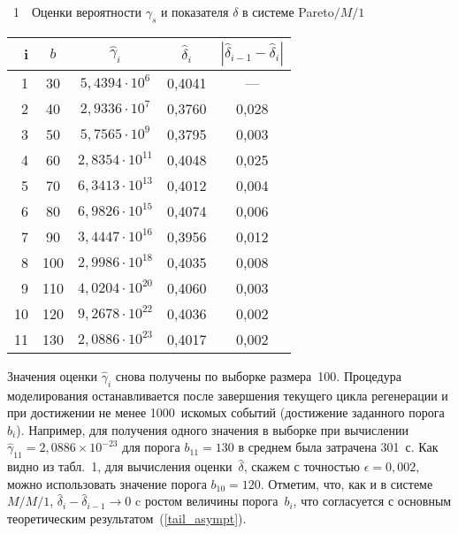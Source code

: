 \begin{multicols}{2}
\bigskip

\noindent
{{\tablename~1}\ \ \small{Оценки  вероятности $\gamma_s$ и показателя $\delta$   в системе Pareto$/M/1$}}

\begin{center} %
\tabcolsep=7.2pt
\begin{tabular}{|r|c|c|c|c|}
\hline
i & $b$ & $\hat\gamma_i $ & $\hat\delta_i$ & $|\hat\delta_{i-1}-\hat\delta_{i}|$ \\
\hline
1 &30 &  $5{,}4394\cdot 10^6$\hphantom{$^1$}& 0,4041 &  --- \\
2&40 &  $2{,}9336\cdot 10^7$\hphantom{$^1$} & 0,3760 &  0,028\\
3&50 & $5{,}7565\cdot 10^9$\hphantom{$^1$} & 0,3795 &      0,003\\
4&60 & $2{,}8354\cdot 10^{11}$ &  0,4048 &  0,025\\
5&70 & $6{,}3413\cdot 10^{13}$ & 0,4012 &      0,004\\
6&80 & $6{,}9826\cdot 10^{15}$ & 0,4074 &  0,006\\
7&90 & $3{,}4447\cdot 10^{16}$ &  0,3956&  0,012\\
8&100\hphantom{9} &$2{,}9986\cdot 10^{18}$  & 0,4035 &  0,008\\
9&110\hphantom{9} & $4{,}0204 \cdot 10^{20}$  & 0,4060 &  0,003\\
10&120\hphantom{9} & $9{,}2678\cdot 10^{22}$  & 0,4036 &  0,002\\
11&130\hphantom{9} & $2{,}0886\cdot 10^{23}$ & 0,4017 &     0,002\\
\hline
\end{tabular}
\end{center}
\vspace*{9pt}




Значения оценки $\hat\gamma_i$ снова получены по выборке размера~100. 
Процедура моделирования останавливается после завершения
текущего цикла регенерации и при достижении не менее 1000~искомых
событий (достижение заданного порога~$b_i$). Например, для получения
одного значения в выборке при вычислении  $\hat\gamma_{11} =
2{,}0886\times 10^{-23}$ для порога $b_{11}=130$ в среднем была
затрачена 301~с. Как видно из табл.~1, для вычисления оценки~$\hat\delta$, скажем  с 
точностью $\epsilon = 0{,}002$,  можно
использовать значение порога $b_{10}=120$. Отметим, что, как и в
системе $M/M/1$, $\hat\delta_i-\hat\delta_{i-1}\to 0$  c ростом
величины порога~$b_i$, что согласуется с основным теоретическим
результатом~(\ref{tail_asympt}).



\end{multicols}
